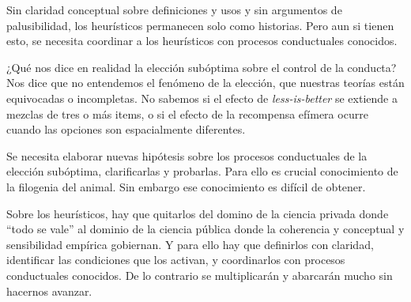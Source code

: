 \documentclass[a4paper,12pt]{article}
\begin{document}
Sin claridad conceptual sobre definiciones y usos y sin argumentos de palusibilidad, los heurísticos permanecen solo como historias. Pero aun si tienen esto, se necesita coordinar a los heurísticos con procesos conductuales conocidos. 

¿Qué nos dice en realidad la elección subóptima sobre el control de la conducta? Nos dice que no entendemos el fenómeno de la elección, que nuestras teorías están equivocadas o incompletas. No sabemos si el efecto de {\itshape less-is-better} se extiende a mezclas de tres o más items, o si el efecto de la recompensa efímera ocurre cuando las opciones son espacialmente diferentes.

Se necesita elaborar nuevas hipótesis sobre los procesos conductuales de la elección subóptima, clarificarlas y probarlas. Para ello es crucial conocimiento de la filogenia del animal. Sin embargo ese conocimiento es difícil de obtener.

Sobre los heurísticos, hay que quitarlos del domino de la ciencia privada donde ``todo se vale'' al dominio de la ciencia pública donde la coherencia y conceptual y sensibilidad empírica gobiernan. Y para ello hay que definirlos con claridad, identificar las condiciones que los activan, y coordinarlos con procesos conductuales conocidos. De lo contrario se multiplicarán y abarcarán mucho sin hacernos avanzar.
\end{document}
